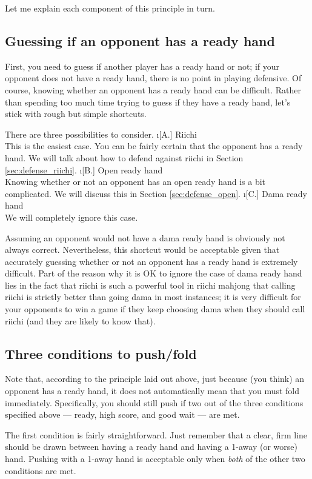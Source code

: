 \noindent Let me explain each component of this principle in turn. 

\subsection{Guessing if an opponent has a ready hand}
First, you need to guess if another player has a ready hand or not; if your opponent does not have a ready hand, there is no point in playing defensive. Of course, knowing whether an opponent has a ready hand can be difficult. Rather than spending too much time trying to guess if they have a ready hand, let's stick with rough but simple shortcuts. 

There are three possibilities to consider. 
\bi
\i[A.] {\jap Riichi}\\
	This is the easiest case. You can be fairly certain that the opponent has a ready hand. We will talk about how to defend against riichi in Section \ref{sec:defense_riichi}.
\i[B.] Open ready hand\\
	Knowing whether or not an opponent has an open ready hand is a bit complicated. We will discuss this in Section \ref{sec:defense_open}. 
\i[C.] {\jap Dama} ready hand\\
	We will completely ignore this case.
\ei

\bigskip
Assuming an opponent would not have a {\jap dama} ready hand is obviously not always correct. Nevertheless, this shortcut would be acceptable given that accurately guessing whether or not an opponent has a ready hand is extremely difficult. Part of the reason why it is OK to ignore the case of {\jap dama} ready hand lies in the fact that riichi is such a powerful tool in riichi mahjong that calling riichi is strictly better than going {\jap dama} in most instances; it is very difficult for your opponents to win a game if they keep choosing {\jap dama} when they should call riichi (and they are likely to know that). 

\subsection{Three conditions to push/fold}
Note that, according to the principle laid out above, just because (you think) an opponent has a ready hand, it does not automatically mean that you must fold immediately. Specifically, you should still push if two out of the three conditions  specified above --- ready, high score, and good wait --- are met. 

\bigskip
The first condition is fairly straightforward. Just remember that a clear, firm line should be drawn between having a ready hand and having a 1-away (or worse) hand. Pushing with a 1-away hand is acceptable only when \emph{both} of the other two conditions are met. 

